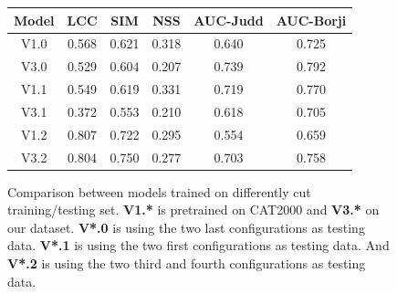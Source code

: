 \begin{figure}[ht!]
    \centering
\begin{tabular}{|c|c|c|c|c|c|}
  \hline
  Model & LCC & SIM & NSS & AUC-Judd & AUC-Borji \\
  \hline
  V1.0 & 0.568 & 0.621 & 0.318 & 0.640 & 0.725 \\
  V3.0 & 0.529 & 0.604 & 0.207 & 0.739 & 0.792\\
  V1.1 & 0.549 & 0.619 & 0.331 & 0.719 & 0.770 \\
  V3.1 & 0.372 & 0.553 & 0.210 & 0.618 & 0.705 \\
  V1.2 & 0.807 & 0.722 & 0.295 & 0.554 & 0.659 \\
  V3.2 & 0.804 & 0.750 & 0.277 & 0.703 & 0.758 \\
  \hline
\end{tabular}
 \caption{Comparison between models trained on differently cut training/testing set. \textbf{V1.*} is pretrained on CAT2000 and \textbf{V3.*} on our dataset. \textbf{V*.0} is using the two last configurations as testing data. \textbf{V*.1} is using the two first configurations as testing data. And 
 \textbf{V*.2} is using the two third and fourth configurations as testing data.} 
 \label{table:comptraintest}
\end{figure}





